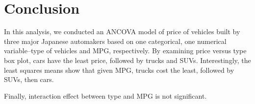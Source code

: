 \documentclass[a4 paper, 11 pt]{article}
\begin{document}
\section{Conclusion}
In this analysis, we conducted an ANCOVA model of price of vehicles built by three major Japanese automakers based on one categorical, one numerical variable--type of vehicles and MPG, respectively. By examining price versus type box plot, cars have the least price, followed by trucks and SUVs. Interestingly, the least squares means show that given MPG, trucks cost the least, followed by SUVs, then cars.

Finally, interaction effect between type and MPG is not significant.
\end{document}
